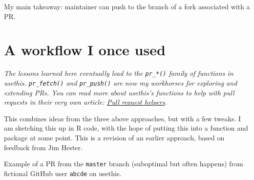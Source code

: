 \documentclass[
]{book}
\begin{document}
My main takeaway: maintainer can push to the branch of a fork associated with a PR.

\section{A workflow I once used}\label{a-workflow-i-once-used}

\emph{The lessons learned here eventually lead to the \texttt{pr\_*()} family of functions in usethis.
\texttt{pr\_fetch()} and \texttt{pr\_push()} are now my workhorses for exploring and extending PRs.
You can read more about usethis's functions to help with pull requests in their very own article: \href{https://usethis.r-lib.org/articles/pr-functions.html}{Pull request helpers}.}

This combines ideas from the three above approaches, but with a few tweaks. I am sketching this up in R code, with the hope of putting this into a function and package at some point. This is a revision of an earlier approach, based on feedback from Jim Hester.

Example of a PR from the \texttt{master} branch (suboptimal but often happens) from fictional GitHub user \texttt{abcde} on usethis.
\end{document}
